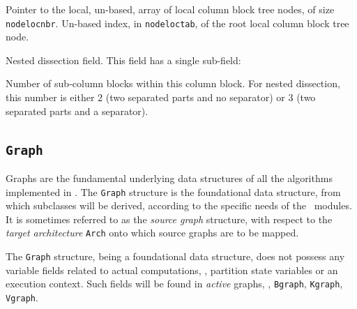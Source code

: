 \begin{itemize}
\begin{itemize}
\begin{itemize}
      Pointer to the local, un-based, array of local column block tree
      nodes, of size \texttt{node\lbt loc\lbt nbr}.
      Un-based index, in \texttt{node\lbt loc\lbt tab}, of the root
      local column block tree node.
    \end{itemize}
    Nested dissection field. This field has a single sub-field:
    \begin{itemize}
      Number of sub-column blocks within this column block. For nested
      dissection, this number is either $2$ (two separated parts and
      no separator) or $3$ (two separated parts and a separator).
    \end{itemize}
  \end{itemize}
\end{itemize}

\subsection{\texttt{Graph}}
\label{sec-data-graph}

Graphs are the fundamental underlying data structures of all the
algorithms implemented in \scotch. The \texttt{Graph} structure is the
foundational data structure, from which subclasses will be derived,
according to the specific needs of the \scotch\ modules. It is
sometimes referred to as the \textit{source graph} structure, with
respect to the \textit{target architecture} \texttt{Arch} onto which
source graphs are to be mapped.

The \texttt{Graph} structure, being a foundational data structure,
does not possess any variable fields related to actual computations,
\eg, partition state variables or an execution context. Such fields
will be found in \textit{active} graphs, \eg, \texttt{Bgraph},
\texttt{Kgraph}, \texttt{Vgraph}.

